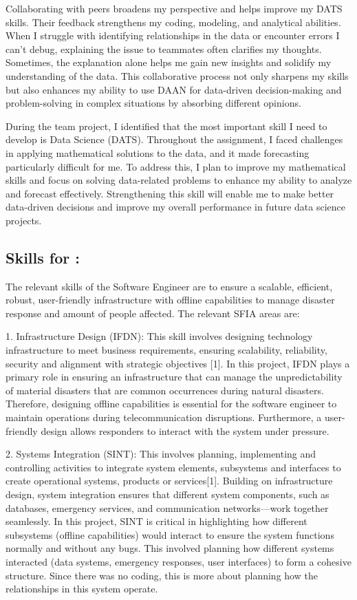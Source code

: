 \documentclass[a4paper, 11pt]{report}
\begin{document}
Collaborating with peers broadens my perspective and helps improve my DATS skills. Their feedback strengthens my coding, modeling, and analytical abilities. When I struggle with identifying relationships in the data or encounter errors I can't debug, explaining the issue to teammates often clarifies my thoughts. Sometimes, the explanation alone helps me gain new insights and solidify my understanding of the data. This collaborative process not only sharpens my skills but also enhances my ability to use DAAN for data-driven decision-making and problem-solving in complex situations by absorbing different opinions.

During the team project, I identified that the most important skill I need to develop is Data Science (DATS). Throughout the assignment, I faced challenges in applying mathematical solutions to the data, and it made forecasting particularly difficult for me. To address this, I plan to improve my mathematical skills and focus on solving data-related problems to enhance my ability to analyze and forecast effectively. Strengthening this skill will enable me to make better data-driven decisions and improve my overall performance in future data science projects.




\subsection{Skills for \majC: \studC}

The relevant skills of the Software Engineer are to ensure a scalable, efficient, robust, user-friendly infrastructure with offline capabilities to manage disaster response and amount of people affected. The relevant SFIA areas are:

1. Infrastructure Design (IFDN): This skill involves designing technology infrastructure to meet business requirements, ensuring scalability, reliability, security and alignment with strategic objectives [1]. In this project, IFDN plays a primary role in ensuring an infrastructure that can manage the unpredictability of material disasters that are common occurrences during natural disasters. Therefore, designing offline capabilities is essential for the software engineer to maintain operations during telecommunication disruptions. Furthermore, a user-friendly design allows responders to interact with the system under pressure.

2. Systems Integration (SINT): This involves planning, implementing and controlling activities to integrate system elements, subsystems and interfaces to create operational systems, products or services[1]. Building on infrastructure design, system integration ensures that different system components, such as databases, emergency services, and communication networks—work together seamlessly. In this project, SINT is critical in highlighting how different subsystems (offline capabilities) would interact to ensure the system functions normally and without any bugs. This involved planning how different systems interacted (data systems, emergency responses, user interfaces) to form a cohesive structure. Since there was no coding, this is more about planning how the relationships in this system operate.
\end{document}
